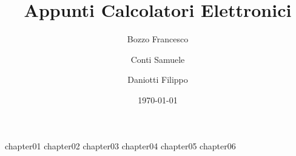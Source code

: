 \documentclass[a4paper,12pt]{book}
\begin{document}
	\author{Bozzo Francesco \and Conti Samuele \and Daniotti Filippo}
	\title{Appunti Calcolatori Elettronici}
	\date{\today}

	\frontmatter
	\maketitle
	\tableofcontents

	\mainmatter

	{chapter01}
	{chapter02}
	{chapter03}
	{chapter04}
	{chapter05}
	{chapter06}

	\backmatter
\end{document}

